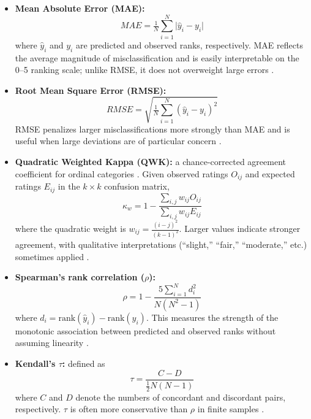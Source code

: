 \begin{itemize}
  \item \textbf{Mean Absolute Error (MAE):}  
  \begin{equation}
    MAE = \tfrac{1}{N}\sum_{i=1}^{N} \lvert \hat{y}_i - y_i \rvert
  \end{equation}
  where $\hat{y}_i$ and $y_i$ are predicted and observed ranks, respectively.
  MAE reflects the average magnitude of misclassification and is easily
  interpretable on the 0–5 ranking scale; unlike RMSE, it does not overweight
  large errors \citep{Willmott2005,Chai2014}.
  
  \item \textbf{Root Mean Square Error (RMSE):}  
  \begin{equation}
  RMSE = \sqrt{\tfrac{1}{N}\sum_{i=1}^{N} \left(\hat{y}_i - y_i\right)^2}
  \end{equation}
  RMSE penalizes larger misclassifications more strongly than MAE and is useful
  when large deviations are of particular concern \citep{Chai2014,Willmott2005}.
  
  \item \textbf{Quadratic Weighted Kappa (QWK):} a chance-corrected agreement
  coefficient for ordinal categories \citep{Cohen1968}. Given observed ratings
  $O_{ij}$ and expected ratings $E_{ij}$ in the $k \times k$ confusion matrix,
  \begin{equation}
    \kappa_w = 1 - \frac{\sum_{i,j} w_{ij} O_{ij}}{\sum_{i,j} w_{ij} E_{ij}}
  \end{equation}
  where the quadratic weight is 
  $w_{ij} = \tfrac{(i-j)^2}{(k-1)^2}$. Larger values indicate stronger
  agreement, with qualitative interpretations (``slight,'' ``fair,''
  ``moderate,'' etc.) sometimes applied \citep{Landis1977}.
  
  \item \textbf{Spearman’s rank correlation ($\rho$):}  
  \begin{equation}
    \rho = 1 - \frac{5\sum_{i=1}^{N} d_i^2}{N(N^2-1)}
  \end{equation}
  where $d_i = \text{rank}(\hat{y}_i) - \text{rank}(y_i)$. This measures the
  strength of the monotonic association between predicted and observed ranks
  without assuming linearity \citep{Spearman1904}.
  
  \item \textbf{Kendall’s $\tau$:} defined as
  \begin{equation}
    \tau = \frac{C - D}{\tfrac{1}{2}N(N-1)}
  \end{equation}
  where $C$ and $D$ denote the numbers of concordant and discordant pairs,
  respectively. $\tau$ is often more conservative than $\rho$ in finite samples
  \citep{kendall_new_1938}.
\end{itemize}

